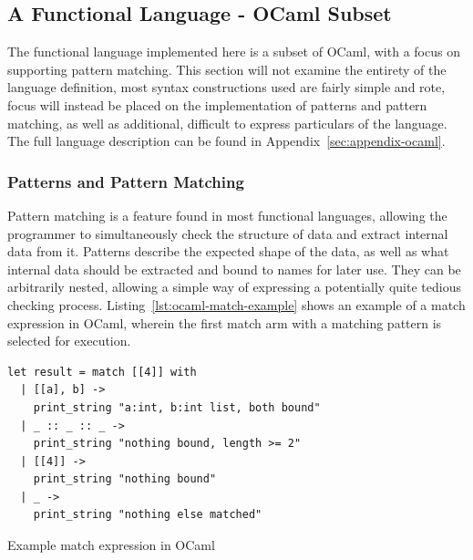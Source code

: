 \documentclass{kththesis}
\begin{document}

\subsection{A Functional Language - OCaml Subset} \label{sec:functional-eval}

The functional language implemented here is a subset of OCaml, with a focus on supporting pattern matching. This section will not examine the entirety of the language definition, most syntax constructions used are fairly simple and rote, focus will instead be placed on the implementation of patterns and pattern matching, as well as additional, difficult to express particulars of the language. The full language description can be found in Appendix~\ref{sec:appendix-ocaml}.

\subsubsection{Patterns and Pattern Matching} \label{sec:functional-pattern-matching}

Pattern matching is a feature found in most functional languages, allowing the programmer to simultaneously check the structure of data and extract internal data from it. Patterns describe the expected shape of the data, as well as what internal data should be extracted and bound to names for later use. They can be arbitrarily nested, allowing a simple way of expressing a potentially quite tedious checking process. Listing~\ref{lst:ocaml-match-example} shows an example of a match expression in OCaml, wherein the first match arm with a matching pattern is selected for execution.

\begin{listing}[ht]
\begin{verbatim}
let result = match [[4]] with
  | [[a], b] ->
    print_string "a:int, b:int list, both bound"
  | _ :: _ :: _ ->
    print_string "nothing bound, length >= 2"
  | [[4]] ->
    print_string "nothing bound"
  | _ ->
    print_string "nothing else matched"
\end{verbatim}
\caption{Example match expression in OCaml}
\label{lst:ocaml-match-example}
\end{listing}
\end{document}
